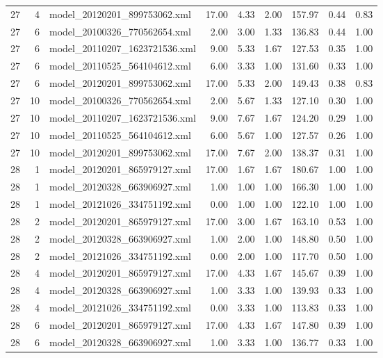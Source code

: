 \begin{table}[ht]
\begin{tabular}{rrlrrrrrr}
   27 &   4 & model\_20120201\_899753062.xml & 17.00 & 4.33 & 2.00 & 157.97 & 0.44 & 0.83 \\ 
   27 &   6 & model\_20100326\_770562654.xml & 2.00 & 3.00 & 1.33 & 136.83 & 0.44 & 1.00 \\ 
   27 &   6 & model\_20110207\_1623721536.xml & 9.00 & 5.33 & 1.67 & 127.53 & 0.35 & 1.00 \\ 
   27 &   6 & model\_20110525\_564104612.xml & 6.00 & 3.33 & 1.00 & 131.60 & 0.33 & 1.00 \\ 
   27 &   6 & model\_20120201\_899753062.xml & 17.00 & 5.33 & 2.00 & 149.43 & 0.38 & 0.83 \\ 
   27 &  10 & model\_20100326\_770562654.xml & 2.00 & 5.67 & 1.33 & 127.10 & 0.30 & 1.00 \\ 
   27 &  10 & model\_20110207\_1623721536.xml & 9.00 & 7.67 & 1.67 & 124.20 & 0.29 & 1.00 \\ 
   27 &  10 & model\_20110525\_564104612.xml & 6.00 & 5.67 & 1.00 & 127.57 & 0.26 & 1.00 \\ 
   27 &  10 & model\_20120201\_899753062.xml & 17.00 & 7.67 & 2.00 & 138.37 & 0.31 & 1.00 \\ 
   28 &   1 & model\_20120201\_865979127.xml & 17.00 & 1.67 & 1.67 & 180.67 & 1.00 & 1.00 \\ 
   28 &   1 & model\_20120328\_663906927.xml & 1.00 & 1.00 & 1.00 & 166.30 & 1.00 & 1.00 \\ 
   28 &   1 & model\_20121026\_334751192.xml & 0.00 & 1.00 & 1.00 & 122.10 & 1.00 & 1.00 \\ 
   28 &   2 & model\_20120201\_865979127.xml & 17.00 & 3.00 & 1.67 & 163.10 & 0.53 & 1.00 \\ 
   28 &   2 & model\_20120328\_663906927.xml & 1.00 & 2.00 & 1.00 & 148.80 & 0.50 & 1.00 \\ 
   28 &   2 & model\_20121026\_334751192.xml & 0.00 & 2.00 & 1.00 & 117.70 & 0.50 & 1.00 \\ 
   28 &   4 & model\_20120201\_865979127.xml & 17.00 & 4.33 & 1.67 & 145.67 & 0.39 & 1.00 \\ 
   28 &   4 & model\_20120328\_663906927.xml & 1.00 & 3.33 & 1.00 & 139.93 & 0.33 & 1.00 \\ 
   28 &   4 & model\_20121026\_334751192.xml & 0.00 & 3.33 & 1.00 & 113.83 & 0.33 & 1.00 \\ 
   28 &   6 & model\_20120201\_865979127.xml & 17.00 & 4.33 & 1.67 & 147.80 & 0.39 & 1.00 \\ 
   28 &   6 & model\_20120328\_663906927.xml & 1.00 & 3.33 & 1.00 & 136.77 & 0.33 & 1.00 \\ 

\end{tabular}
\end{table}
